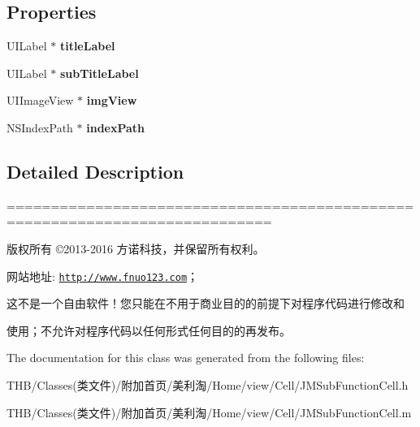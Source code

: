 \subsection*{Properties}
\begin{DoxyCompactItemize}
\item 
\mbox{\label{interface_j_m_sub_function_cell_a371b86f6a510afdacb52fa96432f1c7a}} 
U\+I\+Label $\ast$ {\bfseries title\+Label}
\item 
\mbox{\label{interface_j_m_sub_function_cell_afb7a025df62f608d905c5c455a9cd700}} 
U\+I\+Label $\ast$ {\bfseries sub\+Title\+Label}
\item 
\mbox{\label{interface_j_m_sub_function_cell_ae5f2ed415a5dfd98d9c4987c701a7b66}} 
U\+I\+Image\+View $\ast$ {\bfseries img\+View}
\item 
\mbox{\label{interface_j_m_sub_function_cell_a4767a0fac2af5467f584288fd9c775ea}} 
N\+S\+Index\+Path $\ast$ {\bfseries index\+Path}
\end{DoxyCompactItemize}


\subsection{Detailed Description}
============================================================================

版权所有 ©2013-\/2016 方诺科技，并保留所有权利。

网站地址\+: \href{http://www.fnuo123.com}{\tt http\+://www.\+fnuo123.\+com}； 



这不是一个自由软件！您只能在不用于商业目的的前提下对程序代码进行修改和

使用；不允许对程序代码以任何形式任何目的的再发布。 

 

The documentation for this class was generated from the following files\+:\begin{DoxyCompactItemize}
\item 
T\+H\+B/\+Classes(类文件)/附加首页/美利淘/\+Home/view/\+Cell/J\+M\+Sub\+Function\+Cell.\+h\item 
T\+H\+B/\+Classes(类文件)/附加首页/美利淘/\+Home/view/\+Cell/J\+M\+Sub\+Function\+Cell.\+m\end{DoxyCompactItemize}
